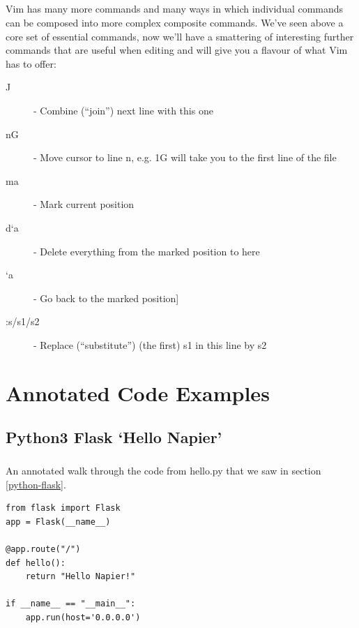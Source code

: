 \documentclass[12pt, a4paper, oneside]{book}
\begin{document}
\paragraph{} Vim has many more commands and many ways in which individual commands can be composed into more complex composite commands. We've seen above a core set of essential commands, now we'll have a smattering of interesting further commands that are useful when editing and will give you a flavour of what Vim has to offer:
\begin{description}
\item[J] - Combine (``join'') next line with this one
\item[nG] - Move cursor to line n, e.g. 1G will take you to the first line of the file
\item[ma] - Mark current position
\item[d`a] - Delete everything from the marked position to here
\item[`a] -  Go back to the marked position] 
\item[:s/s1/s2] - Replace (``substitute'') (the first) s1 in this line by s2
\end{description}


\chapter{Annotated Code Examples}
\label{annotated}

\section{Python3 Flask `Hello Napier'}
\label{annotated_hello_napier}
\paragraph{} An annotated walk through the code from hello.py that we saw in section \ref{python-flask}.

\begin{lstlisting}
from flask import Flask 
app = Flask(__name__)

@app.route("/")
def hello():
    return "Hello Napier!"

if __name__ == "__main__":
    app.run(host='0.0.0.0')

\end{lstlisting}
\end{document}

